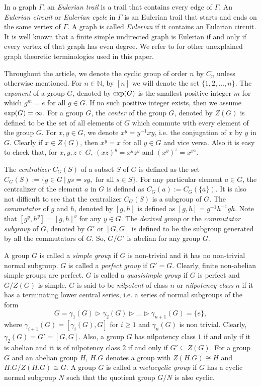\documentclass[12pt,a4paper]{article}
\begin{document}
In a graph $\Gamma$, an \emph{Eulerian trail} is a trail that contains every edge of $\Gamma$. An \emph{Eulerian circuit} or \emph{Eulerian cycle} in $\Gamma$ is an Eulerian trail that starts and ends on the same vertex of $\Gamma$. A graph is called \emph{Eulerian} if it contains an Eularian circuit. It is well known that a finite simple undirected graph is Eulerian if and only if every vertex of that graph has even degree. We refer to \cite{west} for other unexplained graph theoretic terminologies used in this paper.

Throughout the article, we denote the cyclic group of order $n$ by $C_n$ unless otherwise mentioned. For $n\in\mathbb{N}$, by $[n]$ we will denote the set $\{1,2,\dots,n\}$. The \textit{exponent} of a group $G$, denoted by ${\rm exp}(G)$ is the smallest positive integer $m$ for which $g^m=e$ for all $g\in G$. If no such positive integer exists, then we assume ${\rm exp}(G)=\infty$. For a group $G$, the \textit{center} of the group $G$, denoted by $Z(G)$ is defined to be the set of all elements of $G$ which commute with every element of the group $G$. For $x,y\in G$, we denote $x^y=y^{-1}xy$, i.e. the conjugation of $x$ by $y$ in $G$. Clearly if $x\in Z(G)$, then $x^y=x$ for all $y\in G$ and vice versa. Also it is easy to check that, for $x,y,z\in G$, $(xz)^y=x^yz^y$ and $(x^y)^z=x^{yz}$. 

The \textit{centralizer} $C_{G}(S)$ of a subset $S$ of $G$ is defined as the set $C_{G}(S):=\{g\in G~\vert~gs=sg,\text{ for all } s\in S\}$. For any particular element $a\in G$, the centralizer of the element $a$ in $G$ is defined as $C_{G}(a):=C_{G}(\{a\})$. It is also not difficult to see that the centralizer $C_{G}(S)$ is a subgroup of $G$. The \textit{commutator} of $g$ and $h$, denoted by $[g,h]$ is defined as $[g,h]=g^{-1}h^{-1}gh$. Note that $[g^y,h^y]=[g,h]^y$ for any $y\in G$. The \textit{derived group} or the \textit{commutator subgroup} of $G$, denoted by $G'$ or $[G,G]$ is defined to be the subgroup generated by all the commutators of $G$. So, $G/G'$ is abelian for any group $G$.

A group $G$ is called a \textit{simple group} if $G$ is non-trivial and it has no non-trivial normal subgroup. $G$ is called a \textit{perfect group} if $G'=G$. Clearly, finite non-abelian simple groups are perfect. $G$ is called a \textit{quasisimple group} if $G$ is perfect and $G/Z(G)$ is simple. $G$ is said to be \textit{nilpotent} of class $n$ or \textit{nilpotency class} $n$ if it has a terminating lower central series, i.e. a series of normal subgroups of the form $$G=\gamma_1(G)\triangleright \gamma_2(G)\triangleright\dots\triangleright \gamma_{n+1}(G)=\{e\},$$ where $\gamma_{i+1}(G)=[\gamma_i(G),G]$ for $i\geq 1$ and $\gamma_n(G)$ is non trivial. Clearly, $\gamma_2(G)=G'=[G,G]$. Also, a group $G$ has nilpotency class $1$ if and only if it is abelian and it is of nilpotency class $2$ if and only if $G'\subseteq Z(G)$. For a group $G$ and an abelian group $H$, $H.G$ denotes a group with $Z(H.G)\cong H$ and $H.G/Z(H.G)\cong G$. A group $G$ is called a \textit{metacyclic group} if $G$ has a cyclic normal subgroup $N$ such that the quotient group $G/N$ is also cyclic.
\end{document}
